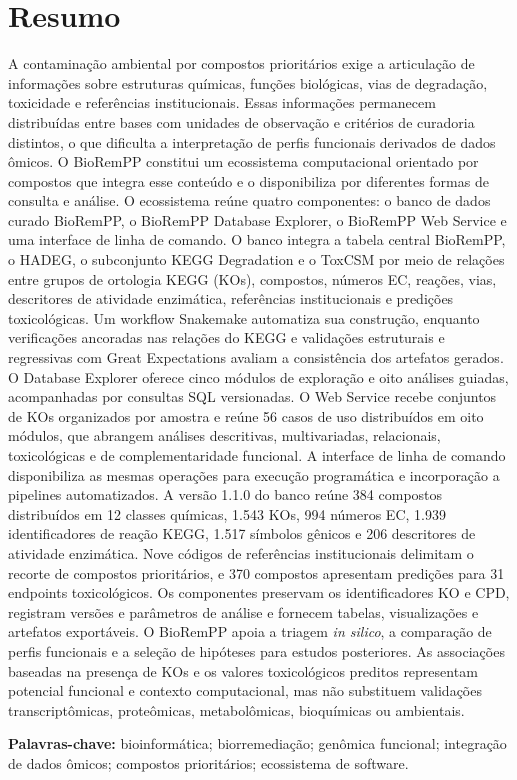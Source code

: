 \chapter*{Resumo}

\vspace{-1.2cm}
\enlargethispage{2\baselineskip}

A contaminação ambiental por compostos prioritários exige a articulação de
informações sobre estruturas químicas, funções biológicas, vias de degradação,
toxicidade e referências institucionais. Essas informações permanecem
distribuídas entre bases com unidades de observação e critérios de curadoria
distintos, o que dificulta a interpretação de perfis funcionais derivados de
dados ômicos. O BioRemPP constitui um ecossistema computacional orientado por
compostos que integra esse conteúdo e o disponibiliza por diferentes formas de
consulta e análise. O ecossistema reúne quatro componentes: o banco de dados
curado BioRemPP, o BioRemPP Database Explorer, o BioRemPP Web Service e uma
interface de linha de comando. O banco integra a tabela central BioRemPP, o
HADEG, o subconjunto KEGG Degradation e o ToxCSM por meio de relações entre
grupos de ortologia KEGG (KOs), compostos, números EC, reações, vias,
descritores de atividade enzimática, referências institucionais e predições
toxicológicas. Um workflow Snakemake automatiza sua construção, enquanto
verificações ancoradas nas relações do KEGG e validações estruturais e
regressivas com Great Expectations avaliam a consistência dos artefatos
gerados. O Database Explorer oferece cinco módulos de exploração e oito
análises guiadas, acompanhadas por consultas SQL versionadas. O Web Service
recebe conjuntos de KOs organizados por amostra e reúne 56 casos de uso
distribuídos em oito módulos, que abrangem análises descritivas,
multivariadas, relacionais, toxicológicas e de complementaridade funcional. A
interface de linha de comando disponibiliza as mesmas operações para execução
programática e incorporação a pipelines automatizados. A versão 1.1.0 do banco
reúne 384 compostos distribuídos em 12 classes químicas, 1.543 KOs, 994 números
EC, 1.939 identificadores de reação KEGG, 1.517 símbolos gênicos e 206
descritores de atividade enzimática. Nove códigos de referências institucionais
delimitam o recorte de compostos prioritários, e 370 compostos apresentam
predições para 31 endpoints toxicológicos. Os componentes preservam os
identificadores KO e CPD, registram versões e parâmetros de análise e fornecem
tabelas, visualizações e artefatos exportáveis. O BioRemPP apoia a triagem
\textit{in silico}, a comparação de perfis funcionais e a seleção de hipóteses
para estudos posteriores. As associações baseadas na presença de KOs e os
valores toxicológicos preditos representam potencial funcional e contexto
computacional, mas não substituem validações transcriptômicas, proteômicas,
metabolômicas, bioquímicas ou ambientais.

\vspace{0.35em}
\noindent\textbf{Palavras-chave:} bioinformática; biorremediação; genômica
funcional; integração de dados ômicos; compostos prioritários; ecossistema de
software.
